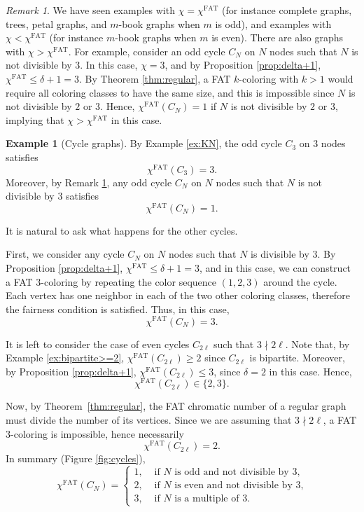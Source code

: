 \documentclass{article}
\theoremstyle{plain}
\theoremstyle{definition}
\newtheorem{example}[theorem]{Example}
\theoremstyle{remark}
\newtheorem{remark}[theorem]{Remark}
\begin{document}
\begin{remark}\label{rmk:chi}
We have seen examples with $\chi=\chi^{\mathrm{FAT}}$ (for instance complete graphs, trees, petal graphs, and $m$-book graphs when $m$ is odd), and examples with $\chi<\chi^{\mathrm{FAT}}$ (for instance $m$-book graphs when $m$ is even). 
There are also graphs with $\chi>\chi^{\mathrm{FAT}}$. For example, consider an odd cycle $C_N$ on $N$ nodes such that $N$ is not divisible by $3$. In this case, $\chi=3$, and by Proposition \ref{prop:delta+1}, $\chi^{\mathrm{FAT}}\leq \delta+1=3$. By Theorem \ref{thm:regular}, a FAT $k$-coloring with $k>1$ would require all coloring classes to have the same size, and this is impossible since $N$ is not divisible by $2$ or $3$. Hence, $\chi^{\mathrm{FAT}}(C_N)=1$ if $N$ is not divisible by $2$ or $3$, implying that $\chi>\chi^{\mathrm{FAT}}$ in this case.
\end{remark}

\begin{example}[Cycle graphs]\label{ex:cyclegraphs}
   By Example \ref{ex:KN}, the odd cycle $C_3$ on $3$ nodes satisfies
   $$\chi^{\mathrm{FAT}}(C_3)=3.$$
   Moreover, by Remark \ref{rmk:chi}, any odd cycle $C_N$ on $N$ nodes such that $N$ is not divisible by $3$ satisfies $$\chi^{\mathrm{FAT}}(C_N)=1.$$ 
   
   It is natural to ask what happens for the other cycles.  



First, we consider any cycle $C_N$ on $N$ nodes such that $N$ is divisible by $3$. By Proposition \ref{prop:delta+1}, $\chi^{\mathrm{FAT}}\leq \delta+1=3$, and in this case, we can construct a FAT $3$-coloring by repeating the color sequence $(1,2,3)$ around the cycle. Each vertex has one neighbor in each of the two other coloring classes, therefore the fairness condition is satisfied. Thus, in this case,
     $$  
       \chi^{\mathrm{FAT}}(C_N)=3.
       $$   

   It is left to consider the case of even cycles $C_{2\ell}$ such that $3\nmid 2\ell$. Note that, by Example \ref{ex:bipartite>=2}, $\chi^{\mathrm{FAT}}(C_{2\ell})\geq 2$ since $C_{2\ell}$ is bipartite. Moreover, by Proposition \ref{prop:delta+1}, $\chi^{\mathrm{FAT}}(C_{2\ell})\leq 3$, since $\delta=2$ in this case. Hence,
   $$
   \chi^{\mathrm{FAT}}(C_{2\ell})\in \{2,3\}.
   $$

Now, by Theorem~\ref{thm:regular}, the FAT chromatic number of a regular graph must divide the number of its vertices. Since we are assuming that $3\nmid 2\ell$, a FAT $3$-coloring is impossible, hence necessarily
       $$
       \chi^{\mathrm{FAT}}(C_{2\ell})=2.
       $$
      In summary (Figure \ref{fig:cycles}), 
   $$
      \chi^{\mathrm{FAT}}(C_N)=\begin{cases}
          1, &\text{ if $N$ is odd and not divisible by $3$},\\
        2, &\text{ if $N$ is even and not divisible by $3$,} \\
        3, &\text{ if $N$ is a multiple of $3$.} 
      \end{cases}
      $$
   \end{example}
\end{document}

